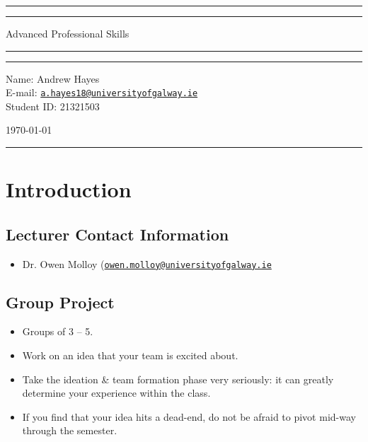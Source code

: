 \documentclass[a4paper,11pt]{article}
\author{Andrew Hayes}
\begin{document}
\begin{titlepage}
    \begin{center}
        \hrule
        \vspace*{0.6cm}
        \vspace*{0.6cm}
        \hrule
        \LARGE
        \vspace{0.5cm}
            Advanced Professional Skills
        \vspace{0.5cm}
        \hrule

        \vfill
        \vfill

        \hrule
        \begin{minipage}{0.495\textwidth} 
            \vspace{0.4em}
            \raggedright
            \normalsize 
            Name: Andrew Hayes \\
            E-mail: \href{mailto://a.hayes18@universityofgalway.ie}{\texttt{a.hayes18@universityofgalway.ie}}  \hfill\\   
            Student ID: 21321503 \hfill
        \end{minipage}
        \begin{minipage}{0.495\textwidth} 
            \raggedleft
            \vspace*{0.8cm}
            \Large
            \today
            \vspace*{0.6cm}
        \end{minipage}
        \medskip\hrule 
    \end{center}
\end{titlepage}

\newpage
\tableofcontents
\newpage
\setcounter{page}{1}

\section{Introduction}
\subsection{Lecturer Contact Information}
\begin{itemize}
    \item   Dr. Owen Molloy (\href{mailto://owen.molloy@universityofgalway.ie}{\texttt{owen.molloy@universityofgalway.ie}}
\end{itemize}

\subsection{Group Project}
\begin{itemize}
    \item   Groups of 3 -- 5.
    \item   Work on an idea that your team is excited about.
    \item   Take the ideation \& team formation phase very seriously: it can greatly determine your experience
            within the class.
    \item   If you find that your idea hits a dead-end, do not be afraid to pivot mid-way through the semester.
\end{itemize}
\end{document}
